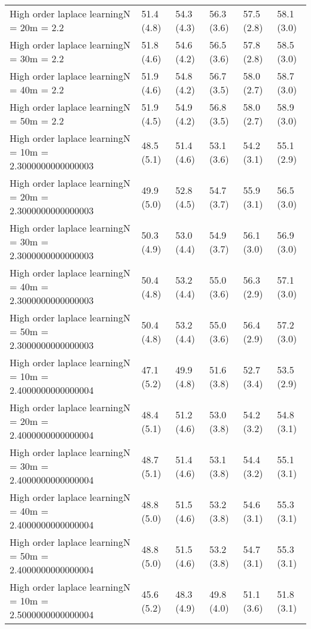 \documentclass{article}
\begin{document}
\begin{table*}[t!]
\begin{center}
\begin{small}
\begin{sc}
\begin{tabular}{llllll}
High order laplace learningN = 20m = 2.2&51.4 (4.8)      &54.3 (4.3)      &56.3 (3.6)      &57.5 (2.8)      &58.1 (3.0)      \\
High order laplace learningN = 30m = 2.2&51.8 (4.6)      &54.6 (4.2)      &56.5 (3.6)      &57.8 (2.8)      &58.5 (3.0)      \\
High order laplace learningN = 40m = 2.2&51.9 (4.6)      &54.8 (4.2)      &56.7 (3.5)      &58.0 (2.7)      &58.7 (3.0)      \\
High order laplace learningN = 50m = 2.2&51.9 (4.5)      &54.9 (4.2)      &56.8 (3.5)      &58.0 (2.7)      &58.9 (3.0)      \\
High order laplace learningN = 10m = 2.3000000000000003&48.5 (5.1)      &51.4 (4.6)      &53.1 (3.6)      &54.2 (3.1)      &55.1 (2.9)      \\
High order laplace learningN = 20m = 2.3000000000000003&49.9 (5.0)      &52.8 (4.5)      &54.7 (3.7)      &55.9 (3.1)      &56.5 (3.0)      \\
High order laplace learningN = 30m = 2.3000000000000003&50.3 (4.9)      &53.0 (4.4)      &54.9 (3.7)      &56.1 (3.0)      &56.9 (3.0)      \\
High order laplace learningN = 40m = 2.3000000000000003&50.4 (4.8)      &53.2 (4.4)      &55.0 (3.6)      &56.3 (2.9)      &57.1 (3.0)      \\
High order laplace learningN = 50m = 2.3000000000000003&50.4 (4.8)      &53.2 (4.4)      &55.0 (3.6)      &56.4 (2.9)      &57.2 (3.0)      \\
High order laplace learningN = 10m = 2.4000000000000004&47.1 (5.2)      &49.9 (4.8)      &51.6 (3.8)      &52.7 (3.4)      &53.5 (2.9)      \\
High order laplace learningN = 20m = 2.4000000000000004&48.4 (5.1)      &51.2 (4.6)      &53.0 (3.8)      &54.2 (3.2)      &54.8 (3.1)      \\
High order laplace learningN = 30m = 2.4000000000000004&48.7 (5.1)      &51.4 (4.6)      &53.1 (3.8)      &54.4 (3.2)      &55.1 (3.1)      \\
High order laplace learningN = 40m = 2.4000000000000004&48.8 (5.0)      &51.5 (4.6)      &53.2 (3.8)      &54.6 (3.1)      &55.3 (3.1)      \\
High order laplace learningN = 50m = 2.4000000000000004&48.8 (5.0)      &51.5 (4.6)      &53.2 (3.8)      &54.7 (3.1)      &55.3 (3.1)      \\
High order laplace learningN = 10m = 2.5000000000000004&45.6 (5.2)      &48.3 (4.9)      &49.8 (4.0)      &51.1 (3.6)      &51.8 (3.1)      \\

\end{tabular}
\end{sc}
\end{small}
\end{center}
\end{table*}
\end{document}

